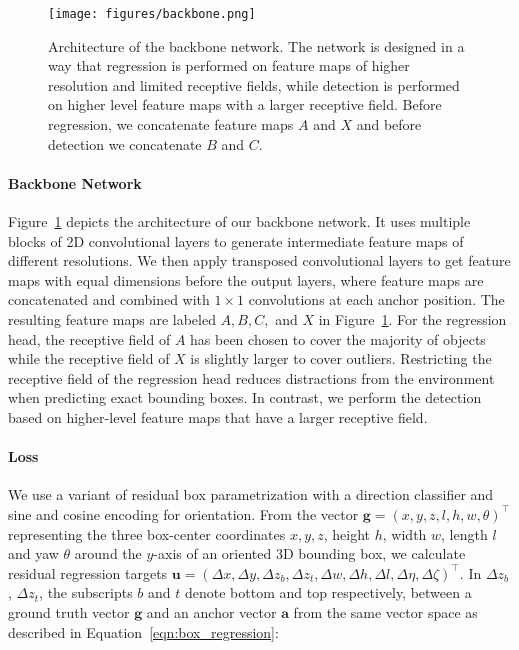 \documentclass{article}
\begin{document}
\begin{figure}[ht]
  \centering
  \texttt{[image: figures/backbone.png]}
  \caption{Architecture of the backbone network. The network is designed in a way that regression is performed on feature maps of higher resolution and limited receptive fields, while detection is performed on higher level feature maps with a larger receptive field. Before regression, we concatenate feature maps $A$ and $X$ and before detection we concatenate $B$ and $C$.}
  \label{fig:backbone}
\end{figure}

\paragraph{Backbone Network}
Figure~\ref{fig:backbone} depicts the architecture of our backbone network.
It uses multiple blocks of 2D convolutional layers to generate intermediate feature maps of different resolutions. We then apply transposed convolutional layers to get feature maps with equal dimensions before the output layers, where feature maps are concatenated and combined with $1 \times 1$ convolutions at each anchor position.
The resulting feature maps are labeled $A, B, C,$ and $X$ in Figure~\ref{fig:backbone}. 
For the regression head, the receptive field of $A$ has been chosen to cover the majority of objects while the receptive field of $X$ is slightly larger to cover outliers.
Restricting the receptive field of the regression head reduces distractions from the environment when predicting exact bounding boxes.
In contrast, we perform the detection based on higher-level feature maps that have a larger receptive field.

\paragraph{Loss}
We use a variant of residual box parametrization with a direction classifier \cite{Yan2018second} and sine and cosine encoding for orientation. 
From the vector $\bm{g} = (x,y,z,l,h,w,\theta)^\top$ representing the three box-center coordinates $x, y, z$, height $h$, width $w$, length $l$ and yaw $\theta$ around the $y$-axis of an oriented 3D bounding box, we calculate 
residual regression targets $\bm{u} = (\Delta x, \Delta y, \Delta z_{b}, \Delta z_{t}, \Delta w, \Delta h, \Delta l, \Delta \eta, \Delta \zeta)^\top$. In $\Delta z_{b}$, $\Delta z_{t}$, the subscripts $b$ and $t$ denote bottom and top respectively, between a ground truth vector $\bm{g}$ and an anchor vector $\bm{a}$ from the same vector space as described in Equation~\eqref{eqn:box_regression}:
\end{document}
